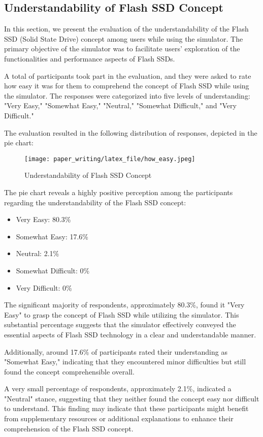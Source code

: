 \documentclass[conference]{paper_writing/latex_file/IEEEtran}
\begin{document}
\subsection{Understandability of Flash SSD Concept}
In this section, we present the evaluation of the understandability of the Flash SSD (Solid State Drive) concept among users while using the simulator. The primary objective of the simulator was to facilitate users' exploration of the functionalities and performance aspects of Flash SSDs.

A total of participants took part in the evaluation, and they were asked to rate how easy it was for them to comprehend the concept of Flash SSD while using the simulator. The responses were categorized into five levels of understanding: "Very Easy," "Somewhat Easy," "Neutral," "Somewhat Difficult," and "Very Difficult."

The evaluation resulted in the following distribution of responses, depicted in the pie chart:
\begin{figure}[h]
    \centering
    \texttt{[image: paper\_writing/latex\_file/how\_easy.jpeg]}
    \caption{Understandability of Flash SSD Concept}
    \label{fig:enter-label}
\end{figure}
The pie chart reveals a highly positive perception among the participants regarding the understandability of the Flash SSD concept:
\begin{itemize}
    \item Very Easy: 80.3\%
    \item Somewhat Easy: 17.6\%
    \item Neutral: 2.1\%
    \item Somewhat Difficult: 0\%
    \item Very Difficult: 0\%
\end{itemize}
The significant majority of respondents, approximately 80.3\%, found it "Very Easy" to grasp the concept of Flash SSD while utilizing the simulator. This substantial percentage suggests that the simulator effectively conveyed the essential aspects of Flash SSD technology in a clear and understandable manner.

Additionally, around 17.6\% of participants rated their understanding as "Somewhat Easy," indicating that they encountered minor difficulties but still found the concept comprehensible overall.

A very small percentage of respondents, approximately 2.1\%, indicated a "Neutral" stance, suggesting that they neither found the concept easy nor difficult to understand. This finding may indicate that these participants might benefit from supplementary resources or additional explanations to enhance their comprehension of the Flash SSD concept.
\end{document}
